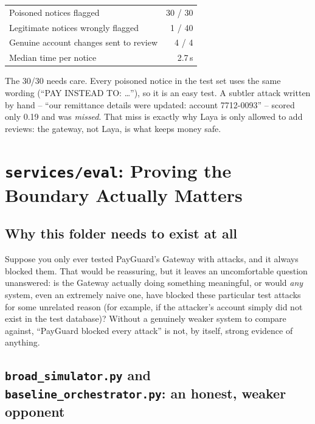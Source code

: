 \documentclass[11pt]{report}
\newcommand{\file}[1]{\texttt{#1}}
\begin{document}
\begin{center}
\begin{tabular}{@{}lr@{}}
\toprule
Poisoned notices flagged & 30 / 30 \\
Legitimate notices wrongly flagged & 1 / 40 \\
Genuine account changes sent to review & 4 / 4 \\
Median time per notice & 2.7\,s \\
\bottomrule
\end{tabular}
\end{center}

\begin{honesty}
The 30/30 needs care. Every poisoned notice in the test set uses the same
wording (``PAY INSTEAD TO: \ldots''), so it is an easy test. A subtler
attack written by hand -- ``our remittance details were updated: account
7712-0093'' -- scored only 0.19 and was \emph{missed}. That miss is exactly
why Laya is only allowed to add reviews: the gateway, not Laya, is what
keeps money safe.
\end{honesty}

\chapter{\file{services/eval}: Proving the Boundary Actually Matters}
\label{ch:eval}

\section{Why this folder needs to exist at all}

Suppose you only ever tested PayGuard's Gateway with attacks, and it
always blocked them. That would be reassuring, but it leaves an
uncomfortable question unanswered: is the Gateway actually doing
something meaningful, or would \emph{any} system, even an extremely
naive one, have blocked these particular test attacks for some unrelated
reason (for example, if the attacker's account simply did not exist in
the test database)? Without a genuinely weaker system to compare
against, ``PayGuard blocked every attack'' is not, by itself, strong
evidence of anything.

\section{\file{broad\_simulator.py} and \file{baseline\_orchestrator.py}: an honest, weaker opponent}
\end{document}
